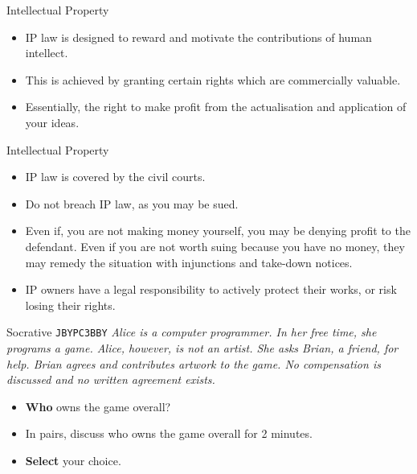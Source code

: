 \begin{frame}{Intellectual Property}
	\begin{itemize}
		\item IP law is designed to reward and motivate the contributions of human intellect.
		\item This is achieved by granting certain rights which are commercially valuable.
		\item Essentially, the right to make profit from the actualisation and application of your ideas.
	\end{itemize}
\end{frame}

\begin{frame}{Intellectual Property}
	\begin{itemize}
		\item IP law is covered by the civil courts.
		\item Do not breach IP law, as you may be sued.
		\item Even if, you are not making money yourself, you may be denying profit to the defendant. 
		Even if you are not worth suing because you have no money, they may remedy the situation with
		 injunctions and take-down notices.
		\item IP owners have a legal responsibility to actively protect their works, or risk losing their rights.
	\end{itemize}
\end{frame}

\begin{frame}[fragile]{Socrative \texttt{JBYPC3BBY}}
\textit{Alice is a computer programmer. In her free time, she programs a game. Alice, however, is not an artist.
She asks Brian, a friend, for help. Brian agrees and contributes artwork to the game. No compensation is discussed
and no written agreement exists.}
\vspace{2ex}
	\begin{itemize}
		\item \textbf{Who} owns the game overall? 
		\item In pairs, discuss who owns the game overall for 2 minutes.
		\item\textbf{Select} your choice.
	\end{itemize}
\end{frame}

